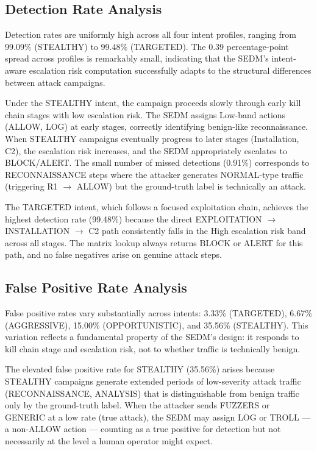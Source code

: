 \subsection{Detection Rate Analysis}

Detection rates are uniformly high across all four intent profiles,
ranging from 99.09\% (STEALTHY) to 99.48\% (TARGETED).
The 0.39 percentage-point spread across profiles is remarkably small,
indicating that the SEDM's intent-aware escalation risk computation
successfully adapts to the structural differences between attack campaigns.

Under the STEALTHY intent, the campaign proceeds slowly through early kill
chain stages with low escalation risk.
The SEDM assigns Low-band actions (ALLOW, LOG) at early stages, correctly
identifying benign-like reconnaissance.
When STEALTHY campaigns eventually progress to later stages (Installation,
C2), the escalation risk increases, and the SEDM appropriately escalates
to BLOCK/ALERT.
The small number of missed detections (0.91\%) corresponds to RECONNAISSANCE
steps where the attacker generates NORMAL-type traffic (triggering R1 $\to$
ALLOW) but the ground-truth label is technically an attack.

The TARGETED intent, which follows a focused exploitation chain, achieves
the highest detection rate (99.48\%) because the direct EXPLOITATION $\to$
INSTALLATION $\to$ C2 path consistently falls in the High escalation risk
band across all stages.
The matrix lookup always returns BLOCK or ALERT for this path, and no false
negatives arise on genuine attack steps.

\subsection{False Positive Rate Analysis}

False positive rates vary substantially across intents: 3.33\% (TARGETED),
6.67\% (AGGRESSIVE), 15.00\% (OPPORTUNISTIC), and 35.56\% (STEALTHY).
This variation reflects a fundamental property of the SEDM's design: it
responds to kill chain stage and escalation risk, not to whether traffic
is technically benign.

The elevated false positive rate for STEALTHY (35.56\%) arises because
STEALTHY campaigns generate extended periods of low-severity attack traffic
(RECONNAISSANCE, ANALYSIS) that is distinguishable from benign traffic only
by the ground-truth label.
When the attacker sends FUZZERS or GENERIC at a low rate (true attack),
the SEDM may assign LOG or TROLL — a non-ALLOW action — counting as a
true positive for detection but not necessarily at the level a human
operator might expect.

